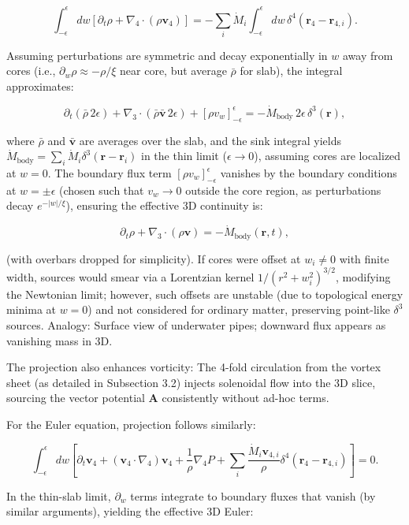 \documentclass{article}
\begin{document}
\[
\int_{-\epsilon}^{\epsilon} dw \left[ \partial_t \rho + \nabla_4 \cdot (\rho \mathbf{v}_4) \right] = -\sum_i \dot{M}_i \int_{-\epsilon}^{\epsilon} dw \, \delta^4(\mathbf{r}_4 - \mathbf{r}_{4,i}).
\]

Assuming perturbations are symmetric and decay exponentially in $w$ away from cores (i.e., $\partial_w \rho \approx - \rho / \xi$ near core, but average $\bar{\rho}$ for slab), the integral approximates:

\[
\partial_t (\bar{\rho} \, 2\epsilon) + \nabla_3 \cdot (\bar{\rho} \bar{\mathbf{v}} \, 2\epsilon) + [\rho v_w]_{-\epsilon}^{\epsilon} = -\dot{M}_{\text{body}} \, 2\epsilon \, \delta^3(\mathbf{r}),
\]

where $\bar{\rho}$ and $\bar{\mathbf{v}}$ are averages over the slab, and the sink integral yields $\dot{M}_{\text{body}} = \sum_i \dot{M}_i \delta^3(\mathbf{r} - \mathbf{r}_i)$ in the thin limit ($\epsilon \to 0$), assuming cores are localized at $w=0$. The boundary flux term $[\rho v_w]_{-\epsilon}^{\epsilon}$ vanishes by the boundary conditions at $w = \pm \epsilon$ (chosen such that $v_w \to 0$ outside the core region, as perturbations decay $e^{-|w|/ \xi}$), ensuring the effective 3D continuity is:

\[
\partial_t \rho + \nabla_3 \cdot (\rho \mathbf{v}) = - \dot{M}_{\text{body}}(\mathbf{r}, t),
\]

(with overbars dropped for simplicity). If cores were offset at $w_i \neq 0$ with finite width, sources would smear via a Lorentzian kernel $1/(r^2 + w_i^2)^{3/2}$, modifying the Newtonian limit; however, such offsets are unstable (due to topological energy minima at $w=0$) and not considered for ordinary matter, preserving point-like $\delta^3$ sources. Analogy: Surface view of underwater pipes; downward flux appears as vanishing mass in 3D.

The projection also enhances vorticity: The 4-fold circulation from the vortex sheet (as detailed in Subsection 3.2) injects solenoidal flow into the 3D slice, sourcing the vector potential $\mathbf{A}$ consistently without ad-hoc terms.

For the Euler equation, projection follows similarly:

\[
\int_{-\epsilon}^{\epsilon} dw \left[ \partial_t \mathbf{v}_4 + (\mathbf{v}_4 \cdot \nabla_4) \mathbf{v}_4 + \frac{1}{\rho} \nabla_4 P + \sum_i \frac{\dot{M}_i \mathbf{v}_{4,i}}{\rho} \delta^4(\mathbf{r}_4 - \mathbf{r}_{4,i}) \right] = 0.
\]

In the thin-slab limit, $\partial_w$ terms integrate to boundary fluxes that vanish (by similar arguments), yielding the effective 3D Euler:
\end{document}

